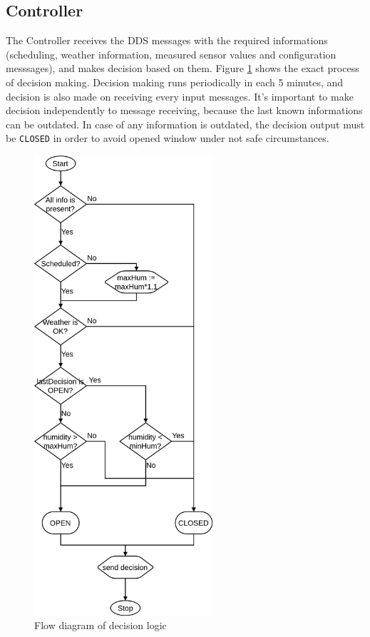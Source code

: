 \documentclass{article}
\begin{document}
\subsection{Controller}
The Controller receives the DDS messages with the required informations (scheduling, weather information, measured sensor values and configuration messsages), and makes decision based on them. Figure \ref{fig:decision_logic} shows the exact process of decision making. Decision making runs periodically in each 5 minutes, and decision is also made on receiving every input messages. It's important to make decision independently to message receiving, because the last known informations can be outdated. In case of any information is outdated, the decision output must be \verb+CLOSED+ in order to avoid opened window under not safe circumstances.
\begin{figure}[!htb]
  \includegraphics[width=250px]{imgs/decision_logic.png}
  \caption{Flow diagram of decision logic}
  \label{fig:decision_logic}
\end{figure} 
\end{document}
